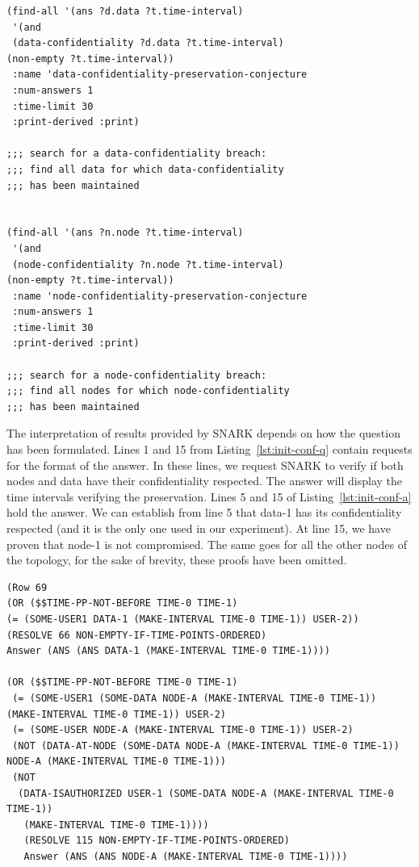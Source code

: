 \begin{lstlisting}[caption=SNARK question to validate the initial situation., label=lst:init-conf-q] 
(find-all '(ans ?d.data ?t.time-interval)
 '(and
 (data-confidentiality ?d.data ?t.time-interval)
(non-empty ?t.time-interval))
 :name 'data-confidentiality-preservation-conjecture
 :num-answers 1
 :time-limit 30  
 :print-derived :print)

;;; search for a data-confidentiality breach:
;;; find all data for which data-confidentiality
;;; has been maintained


(find-all '(ans ?n.node ?t.time-interval)
 '(and
 (node-confidentiality ?n.node ?t.time-interval)
(non-empty ?t.time-interval))
 :name 'node-confidentiality-preservation-conjecture
 :num-answers 1
 :time-limit 30  
 :print-derived :print)

;;; search for a node-confidentiality breach:
;;; find all nodes for which node-confidentiality 
;;; has been maintained
\end{lstlisting}

The interpretation of results provided by SNARK depends on how the question has been formulated.
Lines 1 and 15 from Listing~\ref{lst:init-conf-q} contain requests for the format of the answer.
In these lines, we request SNARK to verify if both nodes and data have their confidentiality respected. The answer will display the time intervals verifying the preservation.
Lines 5 and 15 of Listing~\ref{lst:init-conf-a} hold the answer.
We can establish from line 5 that data-1 has its confidentiality respected (and it is the only one used in our experiment).
At line 15, we have proven that node-1 is not compromised.
The same goes for all the other nodes of the topology, 
for the sake of brevity, these proofs have been omitted.

\begin{lstlisting}[caption=SNARK validating the initial situation, label=lst:init-conf-a] 
(Row 69
(OR ($$TIME-PP-NOT-BEFORE TIME-0 TIME-1) 
(= (SOME-USER1 DATA-1 (MAKE-INTERVAL TIME-0 TIME-1)) USER-2))
(RESOLVE 66 NON-EMPTY-IF-TIME-POINTS-ORDERED)
Answer (ANS (ANS DATA-1 (MAKE-INTERVAL TIME-0 TIME-1)))) 

(OR ($$TIME-PP-NOT-BEFORE TIME-0 TIME-1)
 (= (SOME-USER1 (SOME-DATA NODE-A (MAKE-INTERVAL TIME-0 TIME-1)) (MAKE-INTERVAL TIME-0 TIME-1)) USER-2)
 (= (SOME-USER NODE-A (MAKE-INTERVAL TIME-0 TIME-1)) USER-2)
 (NOT (DATA-AT-NODE (SOME-DATA NODE-A (MAKE-INTERVAL TIME-0 TIME-1)) NODE-A (MAKE-INTERVAL TIME-0 TIME-1)))
 (NOT
  (DATA-ISAUTHORIZED USER-1 (SOME-DATA NODE-A (MAKE-INTERVAL TIME-0 TIME-1))
   (MAKE-INTERVAL TIME-0 TIME-1))))
   (RESOLVE 115 NON-EMPTY-IF-TIME-POINTS-ORDERED)
   Answer (ANS (ANS NODE-A (MAKE-INTERVAL TIME-0 TIME-1)))) 
\end{lstlisting}


